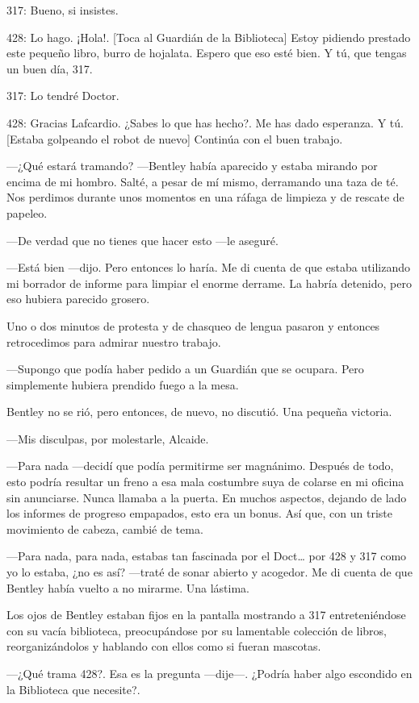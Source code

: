 317: Bueno, si insistes.

428: Lo hago. ¡Hola!. {[}Toca al Guardián de la Biblioteca{]} Estoy
pidiendo prestado este pequeño libro, burro de hojalata. Espero que eso
esté bien. Y tú, que tengas un buen día, 317.

317: Lo tendré Doctor.

428: Gracias Lafcardio. ¿Sabes lo que has hecho?. Me has dado esperanza.
Y tú. {[}Estaba golpeando el robot de nuevo{]} Continúa con el buen
trabajo.

---¿Qué estará tramando? ---Bentley había aparecido y estaba mirando por
encima de mi hombro. Salté, a pesar de mí mismo, derramando una taza de
té. Nos perdimos durante unos momentos en una ráfaga de limpieza y de
rescate de papeleo.

---De verdad que no tienes que hacer esto ---le aseguré.

---Está bien ---dijo. Pero entonces lo haría. Me di cuenta de que estaba
utilizando mi borrador de informe para limpiar el enorme derrame. La
habría detenido, pero eso hubiera parecido grosero.

Uno o dos minutos de protesta y de chasqueo de lengua pasaron y entonces
retrocedimos para admirar nuestro trabajo.

---Supongo que podía haber pedido a un Guardián que se ocupara. Pero
simplemente hubiera prendido fuego a la mesa.

Bentley no se rió, pero entonces, de nuevo, no discutió. Una pequeña
victoria.

---Mis disculpas, por molestarle, Alcaide.

---Para nada ---decidí que podía permitirme ser magnánimo. Después de
todo, esto podría resultar un freno a esa mala costumbre suya de colarse
en mi oficina sin anunciarse. Nunca llamaba a la puerta. En muchos
aspectos, dejando de lado los informes de progreso empapados, esto era
un bonus. Así que, con un triste movimiento de cabeza, cambié de tema.

---Para nada, para nada, estabas tan fascinada por el Doct\ldots{} por
428 y 317 como yo lo estaba, ¿no es así? ---traté de sonar abierto y
acogedor. Me di cuenta de que Bentley había vuelto a no mirarme. Una
lástima.

Los ojos de Bentley estaban fijos en la pantalla mostrando a 317
entreteniéndose con su vacía biblioteca, preocupándose por su lamentable
colección de libros, reorganizándolos y hablando con ellos como si
fueran mascotas.

---¿Qué trama 428?. Esa es la pregunta ---dije---. ¿Podría haber algo
escondido en la Biblioteca que necesite?.

